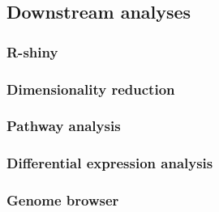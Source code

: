 \subsection{Downstream analyses}
\subsubsection{R-shiny}
\subsubsection{Dimensionality reduction}
\subsubsection{Pathway analysis}
\subsubsection{Differential expression analysis}
\subsubsection{Genome browser}
